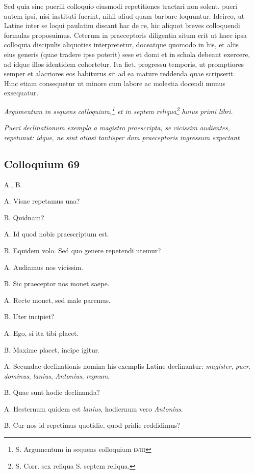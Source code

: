 \documentclass{article}
\begin{document}
Sed quia sine puerili colloquio eiusmodi repetitiones tractari non solent, pueri autem ipsi, nisi instituti fuerint, nihil aliud quam barbare loquuntur. Idcirco, ut Latine inter se loqui paulatim discant hac de re, hic aliquot breves colloquendi formulas proposuimus. Ceterum in praeceptoris diligentia situm erit ut haec ipsa colloquia discipulis aliquoties interpretetur, doceatque quomodo in his, et aliis eius generis (quae tradere ipse poterit) sese et domi et in schola debeant exercere, ad idque illos identidem cohortetur. Ita fiet, progressu temporis, ut promptiores semper et alacriores eos habiturus sit ad ea mature reddenda quae scripserit. Hinc etiam consequetur ut minore cum labore ac molestia docendi munus exsequatur.

\emph{Argumentum in sequens colloquium,\footnote{S. Argumentum in sequens colloquium \textsc{lviii}} et in septem reliqua\footnote{S. Corr. sex reliqua S. septem reliqua.} huius primi libri.}

\emph{Pueri declinationum exempla a magistro praescripta, se vicissim audientes, repetunut: idque, ne sint otiosi tantisper dum praeceptoris ingressum expectant}

\subsection{Colloquium 69}

A., B.

A. Visne repetamus una?

B. Quidnam?

A. Id quod nobis praescriptum est.

B. Equidem volo. Sed quo genere repetendi utemur?

A. Audiamus nos vicissim.

B. Sic praeceptor nos monet saepe.

A. Recte monet, sed male paremus.

B. Uter incipiet?

A. Ego, si ita tibi placet.

B. Maxime placet, incipe igitur.

A. Secundae declinationis nomina his exemplis Latine declinantur: \emph{magister}, \emph{puer}, \emph{dominus}, \emph{lanius}, \emph{Antonius}, \emph{regnum}.

B. Quae sunt hodie declinanda?

A. Hesternum quidem est \emph{lanius}, hodiernum vero \emph{Antonius}.

B. Cur nos id repetimus quotidie, quod pridie reddidimus?
\end{document}
